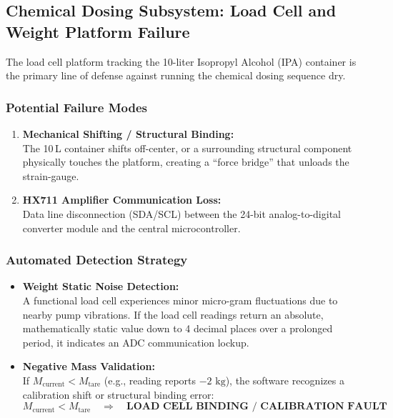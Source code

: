 \documentclass[12pt,a4paper]{article}
\begin{document}
\subsection{Chemical Dosing Subsystem: Load Cell and Weight Platform Failure}

The load cell platform tracking the 10-liter Isopropyl Alcohol (IPA) container is the primary line of defense against running the chemical dosing sequence dry.

\subsubsection*{Potential Failure Modes}

\begin{enumerate}
    \item \textbf{Mechanical Shifting / Structural Binding:} \\ The 10\,L container shifts off-center, or a surrounding structural component physically touches the platform, creating a ``force bridge'' that unloads the strain-gauge.
    \item \textbf{HX711 Amplifier Communication Loss:} \\ Data line disconnection (SDA/SCL) between the 24-bit analog-to-digital converter module and the central microcontroller.
\end{enumerate}

\subsubsection*{Automated Detection Strategy}

\begin{itemize}
    \item \textbf{Weight Static Noise Detection:} \\ A functional load cell experiences minor micro-gram fluctuations due to nearby pump vibrations. If the load cell readings return an absolute, mathematically static value down to 4 decimal places over a prolonged period, it indicates an ADC communication lockup.

    \item \textbf{Negative Mass Validation:} \\ If $M_{\text{current}} < M_{\text{tare}}$ (e.g., reading reports $-2\text{ kg}$), the software recognizes a calibration shift or structural binding error:
    \[
    M_{\text{current}} < M_{\text{tare}}
    \quad \Rightarrow \quad \textbf{LOAD CELL BINDING / CALIBRATION FAULT}
    \]
\end{itemize}
\end{document}
